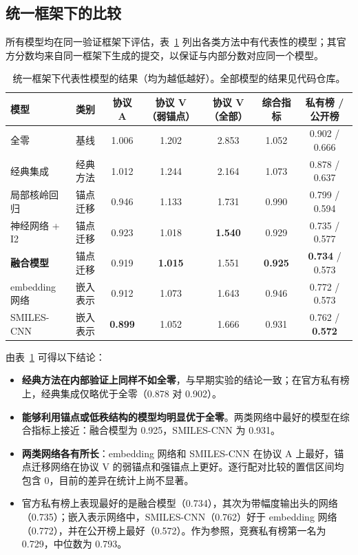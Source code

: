 \documentclass[11pt,a4paper]{article}
\begin{document}
\subsection{统一框架下的比较}
所有模型均在同一验证框架下评估，表~\ref{tab:main} 列出各类方法中有代表性的模型；其官方分数均来自同一框架下生成的提交，以保证与内部分数对应同一个模型。

\begin{table}[!ht]
\centering\small
\caption{统一框架下代表性模型的结果（均为越低越好）。全部模型的结果见代码仓库。}\label{tab:main}
\setlength{\tabcolsep}{4pt}
\begin{tabular}{@{}llccccc@{}}
\toprule
模型 & 类别 & 协议 A & 协议 V（弱锚点） & 协议 V（全部） & 综合指标 & 私有榜 / 公开榜 \\
\midrule
全零 & 基线 & 1.006 & 1.202 & 2.853 & 1.052 & 0.902 / 0.666 \\
经典集成 & 经典方法 & 1.012 & 1.244 & 2.164 & 1.073 & 0.878 / 0.637 \\
\midrule
局部核岭回归 & 锚点迁移 & 0.946 & 1.133 & 1.731 & 0.990 & 0.799 / 0.594 \\
神经网络 + I2 & 锚点迁移 & 0.923 & 1.018 & \textbf{1.540} & 0.929 & 0.735 / 0.577 \\
\textbf{融合模型} & 锚点迁移 & 0.919 & \textbf{1.015} & 1.551 & \textbf{0.925} & \textbf{0.734} / 0.573 \\
\midrule
embedding 网络 & 嵌入表示 & 0.912 & 1.073 & 1.643 & 0.946 & 0.772 / 0.573 \\
SMILES-CNN & 嵌入表示 & \textbf{0.899} & 1.052 & 1.666 & 0.931 & 0.762 / \textbf{0.572} \\
\bottomrule
\end{tabular}
\end{table}

由表~\ref{tab:main} 可得以下结论：
\begin{itemize}
\item \textbf{经典方法在内部验证上同样不如全零}，与早期实验的结论一致；在官方私有榜上，经典集成仅略优于全零（0.878 对 0.902）。
\item \textbf{能够利用锚点或低秩结构的模型均明显优于全零}。两类网络中最好的模型在综合指标上接近：融合模型为 0.925，SMILES-CNN 为 0.931。
\item \textbf{两类网络各有所长}：embedding 网络和 SMILES-CNN 在协议 A 上最好，锚点迁移网络在协议 V 的弱锚点和强锚点上更好。逐行配对比较的置信区间均包含 0，目前的差异在统计上尚不显著。
\item 官方私有榜上表现最好的是融合模型（0.734），其次为带幅度输出头的网络（0.735）；嵌入表示网络中，SMILES-CNN（0.762）好于 embedding 网络（0.772），并在公开榜上最好（0.572）。作为参照，竞赛私有榜第一名为 0.729，中位数为 0.793。
\end{itemize}
\end{document}
